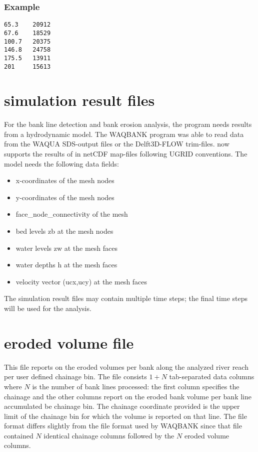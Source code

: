 \subsubsection*{Example}

\begin{Verbatim}
65.3    20912
67.6    18529
100.7   20375
146.8   24758
175.5   13911
201     15613
\end{Verbatim}

\section{simulation result files}

For the bank line detection and bank erosion analysis, the program  needs results from a hydrodynamic model.
The WAQBANK program was able to read data from the WAQUA SDS-output files or the Delft3D-FLOW trim-files.
\dfastbe now supports the results of \dflowfm in netCDF map-files following UGRID conventions.
The model needs the following data fields:

\begin{itemize}
\item x-coordinates of the mesh nodes
\item y-coordinates of the mesh nodes
\item face\_node\_connectivity of the mesh
\item bed levels zb at the mesh nodes
\item water levels zw at the mesh faces
\item water depths h at the mesh faces
\item velocity vector (ucx,ucy) at the mesh faces
\end{itemize}

The simulation result files may contain multiple time steps; the final time steps will be used for the analysis.


\section{eroded volume file}

This file reports on the eroded volumes per bank along the analyzed river reach per user defined chainage bin.
The file consists $1+N$ tab-separated data columns where $N$ is the number of bank lines processed: the first column specifies the chainage and the other columns report on the eroded bank volume per bank line accumulated be chainage bin.
The chainage coordinate provided is the upper limit of the chainage bin for which the volume is reported on that line.
The file format differs slightly from the file format used by WAQBANK since that file contained $N$ identical chainage columns followed by the $N$ eroded volume columns.

